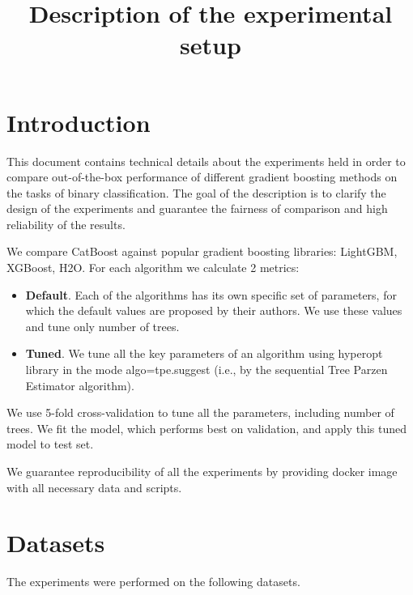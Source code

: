 \documentclass{article}
\title{Description of the experimental setup}
\date{}
\begin{document}
\maketitle

\section{Introduction}
This document contains technical details about the experiments held in order to compare out-of-the-box performance of different gradient boosting methods on the tasks of binary classification. The goal of the description is to clarify the design of the experiments and guarantee the fairness of comparison and high reliability of the results.

We compare CatBoost against popular gradient boosting libraries: LightGBM, XGBoost, H2O. For each algorithm we calculate 2 metrics:
\begin{itemize}
\item
{\bfseries Default}. Each of the algorithms has its own specific set of parameters, for which the default values are proposed by their authors. We use these values and tune only number of trees.

\item
{\bfseries Tuned}. We tune all the key parameters of an algorithm using hyperopt library in the mode algo=tpe.suggest (i.e., by the sequential Tree Parzen Estimator algorithm).
\end{itemize}

We use 5-fold cross-validation to tune all the parameters, including number of trees. We fit the model, which performs best on validation, and apply this tuned model to test set.

We guarantee reproducibility of all the experiments by providing docker image with all necessary data and scripts.

\section{Datasets}
The experiments were performed on the following datasets.
\end{document}
